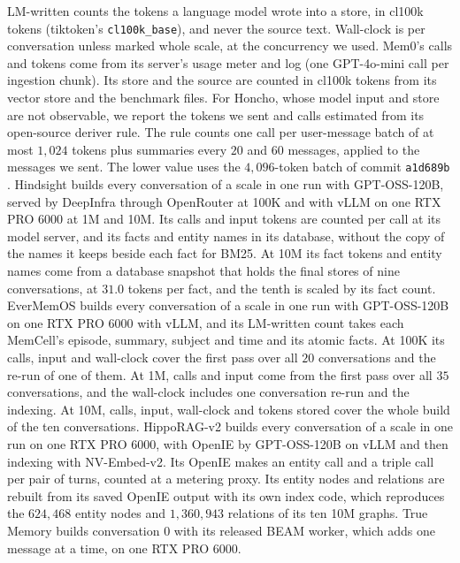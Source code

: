 \documentclass{article}
\begin{document}
LM-written counts the tokens a language model wrote into a store, in cl100k tokens (tiktoken's \texttt{cl100k\_base}), and never the source text. Wall-clock is per conversation unless marked whole scale, at the concurrency we used. Mem0's calls and tokens come from its server's usage meter and log (one GPT-4o-mini call per ingestion chunk). Its store and the source are counted in cl100k tokens from its vector store and the benchmark files. For Honcho, whose model input and store are not observable, we report the tokens we sent and calls estimated from its open-source deriver rule. The rule counts one call per user-message batch of at most $1{,}024$ tokens plus summaries every $20$ and $60$ messages, applied to the messages we sent. The lower value uses the $4{,}096$-token batch of commit \texttt{a1d689b} \cite{honcho}. Hindsight builds every conversation of a scale in one run with GPT-OSS-120B, served by DeepInfra through OpenRouter at 100K and with vLLM on one RTX PRO 6000 at 1M and 10M. Its calls and input tokens are counted per call at its model server, and its facts and entity names in its database, without the copy of the names it keeps beside each fact for BM25. At 10M its fact tokens and entity names come from a database snapshot that holds the final stores of nine conversations, at $31.0$ tokens per fact, and the tenth is scaled by its fact count. EverMemOS builds every conversation of a scale in one run with GPT-OSS-120B on one RTX PRO 6000 with vLLM, and its LM-written count takes each MemCell's episode, summary, subject and time and its atomic facts. At 100K its calls, input and wall-clock cover the first pass over all $20$ conversations and the re-run of one of them. At 1M, calls and input come from the first pass over all $35$ conversations, and the wall-clock includes one conversation re-run and the indexing. At 10M, calls, input, wall-clock and tokens stored cover the whole build of the ten conversations. HippoRAG-v2 builds every conversation of a scale in one run on one RTX PRO 6000, with OpenIE by GPT-OSS-120B on vLLM and then indexing with NV-Embed-v2. Its OpenIE makes an entity call and a triple call per pair of turns, counted at a metering proxy. Its entity nodes and relations are rebuilt from its saved OpenIE output with its own index code, which reproduces the $624{,}468$ entity nodes and $1{,}360{,}943$ relations of its ten 10M graphs. True Memory builds conversation 0 with its released BEAM worker, which adds one message at a time, on one RTX PRO 6000.
\end{document}
